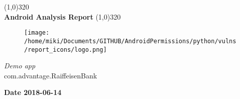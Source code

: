 \documentclass[12p]{article}
\begin{document}
\begin{titlepage}
\begin{center}
\line(1,0){320}\\
[0.25in]
\huge{\bfseries Android Analysis Report}
\line(1,0){320}\\
[0.5in]
\begin{figure}[H]
	\centering
	\texttt{[image: /home/miki/Documents/GITHUB/AndroidPermissions/python/vulns/report\_icons/logo.png]}
\end{figure}
\textsl{\LARGE Demo app}\\
\textsf{\LARGE com.advantage.RaiffeisenBank}\\
[2.5in]
\end{center}
\begin{flushright}
\textbf{\large Date 2018-06-14}
\end{flushright}
\end{titlepage}
\tableofcontents
\thispagestyle{empty}
\cleardoublepage
\setcounter{page}{1}
\end{document}
